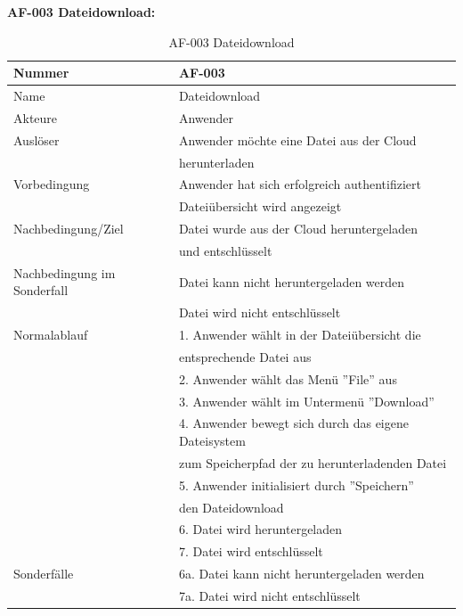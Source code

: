 \documentclass[12pt,a4paper,bibliography=totocnumbered,listof=totocnumbered]{scrartcl}
\begin{document}
\begin{appendix}
\textbf{AF-003 Dateidownload:}
\begin{table}[!h]
	\centering
	\begin{tabular}{|l|l|}
		\hline
		Nummer & AF-003\\
		\hline
		Name & Dateidownload\\
		\hline
		Akteure & Anwender\\
		\hline
		Auslöser & Anwender möchte eine Datei aus der Cloud \\ & herunterladen\\
		\hline
		Vorbedingung & Anwender hat sich erfolgreich authentifiziert \\ & Dateiübersicht wird angezeigt\\
		\hline
		Nachbedingung/Ziel & Datei wurde aus der Cloud heruntergeladen \\ & und entschlüsselt \\
		\hline
		Nachbedingung im Sonderfall & Datei kann nicht heruntergeladen werden \\ & Datei wird nicht entschlüsselt\\
		\hline
		Normalablauf & 1. Anwender wählt in der Dateiübersicht die \\ & entsprechende Datei aus \\ & 2. Anwender wählt das Menü ''File'' aus \\ & 3. Anwender wählt im Untermenü ''Download'' \\ & 4. Anwender bewegt sich durch das eigene Dateisystem \\ & zum Speicherpfad der zu herunterladenden Datei \\ & 5. Anwender initialisiert durch ''Speichern'' \\ & den Dateidownload \\  & 6. Datei wird heruntergeladen \\ & 7. Datei wird entschlüsselt \\
		\hline
		Sonderfälle & 6a. Datei kann nicht heruntergeladen werden \\ & 7a. Datei wird nicht entschlüsselt\\
		\hline
	\end{tabular}
	\caption{AF-003 Dateidownload}
	\label{tab:AF-003 Dateidownload}
\end{table}


\end{appendix}
\end{document}
